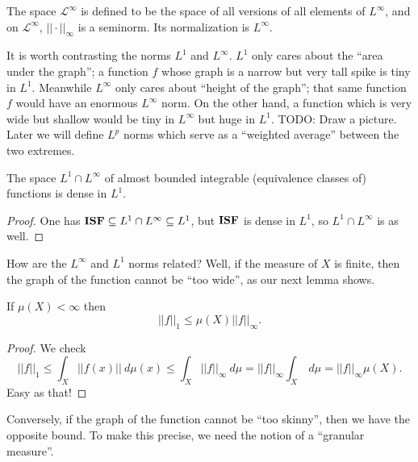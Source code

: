 \begin{subsec}
The space $\mathcal L^\infty$ is defined to be the space of all versions of all elements of $L^\infty$, and on $\mathcal L^\infty$, $||\cdot||_\infty$ is a seminorm. Its normalization is $L^\infty$.
\end{subsec}

\begin{subsec}
It is worth contrasting the norms $L^1$ and $L^\infty$. $L^1$ only cares about the ``area under the graph''; a function $f$ whose graph is a narrow but very tall spike is tiny in $L^1$. Meanwhile $L^\infty$ only cares about ``height of the graph''; that same function $f$ would have an enormous $L^\infty$ norm.
On the other hand, a function which is very wide but shallow would be tiny in $L^\infty$ but huge in $L^1$. TODO: Draw a picture.
Later we will define $L^p$ norms which serve as a ``weighted average'' between the two extremes.
\end{subsec}

\begin{lemma}
The space $L^1 \cap L^\infty$ of almost bounded integrable (equivalence classes of) functions is dense in $L^1$.
\end{lemma}
\begin{proof}
One has $\mathbf{ISF} \subseteq L^1 \cap L^{\infty} \subseteq L^1$, but $\mathbf{ISF}$ is dense in $L^1$, so $L^1 \cap L^\infty$ is as well.
\end{proof}

\begin{subsec}
How are the $L^\infty$ and $L^1$ norms related?
Well, if the measure of $X$ is finite, then the graph of the function cannot be ``too wide'', as our next lemma shows.
\end{subsec}

\begin{lemma}
If $\mu(X) < \infty$ then
\[||f||_1 \leq \mu(X) ||f||_\infty.\]
\end{lemma}
\begin{proof}
We check
\[||f||_1 \leq \int_{X} ||f(x)||~d\mu(x) \leq \int_{X} ||f||_{\infty} ~d\mu = ||f||_{\infty} \int_{X} ~d\mu = ||f||_{\infty} \mu(X).\]
Easy as that!
\end{proof}

\begin{subsec}
Conversely, if the graph of the function cannot be ``too skinny'', then we have the opposite bound.
To make this precise, we need the notion of a ``granular measure''.
\end{subsec}

